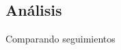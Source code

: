 \documentclass[]{beamer}
\begin{document}
\subsection{Análisis}


\begin{frame}[t]{Comparando seguimientos}
    \small


\end{frame}
\end{document}
